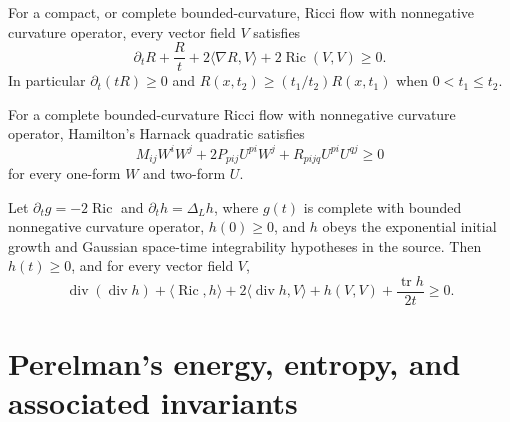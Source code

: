 \begin{theorem}
\label{thm:chow-ii-appd-trace-harnack}


For a compact, or complete bounded-curvature, Ricci flow with nonnegative
curvature operator, every vector field $V$ satisfies
\[
 \partial_tR+\frac Rt+2\langle\nabla R,V\rangle
 +2\operatorname{Ric}(V,V)\geq0.
\]
In particular $\partial_t(tR)\geq0$ and
$R(x,t_2)\geq(t_1/t_2)R(x,t_1)$ when $0<t_1\leq t_2$.
\end{theorem}

\begin{theorem}
\label{thm:chow-ii-appd-matrix-harnack}


For a complete bounded-curvature Ricci flow with nonnegative curvature
operator, Hamilton's Harnack quadratic satisfies
\[
 M_{ij}W^iW^j+2P_{pij}U^{pi}W^j+R_{pijq}U^{pi}U^{qj}\geq0
\]
for every one-form $W$ and two-form $U$.
\end{theorem}

\begin{theorem}
\label{thm:chow-ii-appd-linear-trace-harnack}

Let $\partial_tg=-2\operatorname{Ric}$ and $\partial_th=\Delta_Lh$, where
$g(t)$ is complete with bounded nonnegative curvature operator, $h(0)\geq0$,
and $h$ obeys the exponential initial growth and Gaussian space-time
integrability hypotheses in the source. Then $h(t)\geq0$, and for every vector
field $V$,
\[
 \operatorname{div}(\operatorname{div}h)+\langle\operatorname{Ric},h\rangle
 +2\langle\operatorname{div}h,V\rangle+h(V,V)+\frac{\operatorname{tr}h}{2t}
 \geq0.
\]
\end{theorem}

\section{Perelman's energy, entropy, and associated invariants}

